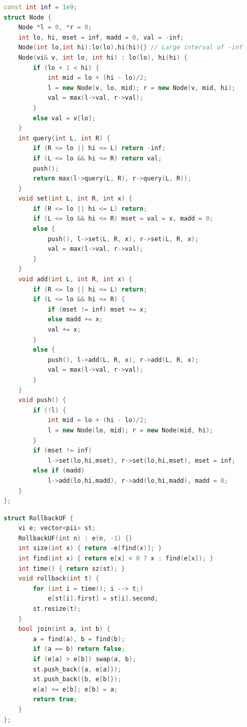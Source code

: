 \begin{multicols}{\Columns}
\begin{lstlisting}[language=C++]
const int inf = 1e9;
struct Node {
	Node *l = 0, *r = 0;
	int lo, hi, mset = inf, madd = 0, val = -inf;
	Node(int lo,int hi):lo(lo),hi(hi){} // Large interval of -inf
	Node(vi& v, int lo, int hi) : lo(lo), hi(hi) {
		if (lo + 1 < hi) {
			int mid = lo + (hi - lo)/2;
			l = new Node(v, lo, mid); r = new Node(v, mid, hi);
			val = max(l->val, r->val);
		}
		else val = v[lo];
	}
	int query(int L, int R) {
		if (R <= lo || hi <= L) return -inf;
		if (L <= lo && hi <= R) return val;
		push();
		return max(l->query(L, R), r->query(L, R));
	}
	void set(int L, int R, int x) {
		if (R <= lo || hi <= L) return;
		if (L <= lo && hi <= R) mset = val = x, madd = 0;
		else {
			push(), l->set(L, R, x), r->set(L, R, x);
			val = max(l->val, r->val);
		}
	}
	void add(int L, int R, int x) {
		if (R <= lo || hi <= L) return;
		if (L <= lo && hi <= R) {
			if (mset != inf) mset += x;
			else madd += x;
			val += x;
		}
		else {
			push(), l->add(L, R, x), r->add(L, R, x);
			val = max(l->val, r->val);
		}
	}
	void push() {
		if (!l) {
			int mid = lo + (hi - lo)/2;
			l = new Node(lo, mid); r = new Node(mid, hi);
		}
		if (mset != inf)
			l->set(lo,hi,mset), r->set(lo,hi,mset), mset = inf;
		else if (madd)
			l->add(lo,hi,madd), r->add(lo,hi,madd), madd = 0;
	}
};
\end{lstlisting}

\begin{lstlisting}[language=C++]
struct RollbackUF {
	vi e; vector<pii> st;
	RollbackUF(int n) : e(n, -1) {}
	int size(int x) { return -e[find(x)]; }
	int find(int x) { return e[x] < 0 ? x : find(e[x]); }
	int time() { return sz(st); }
	void rollback(int t) {
		for (int i = time(); i --> t;)
			e[st[i].first] = st[i].second;
		st.resize(t);
	}
	bool join(int a, int b) {
		a = find(a), b = find(b);
		if (a == b) return false;
		if (e[a] > e[b]) swap(a, b);
		st.push_back({a, e[a]});
		st.push_back({b, e[b]});
		e[a] += e[b]; e[b] = a;
		return true;
	}
};
\end{lstlisting}


\end{multicols}

